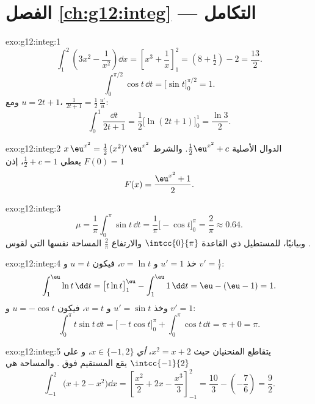 \section*{الفصل \ref{ch:g12:integ} --- التكامل}

\begin{solution}{exo:g12:integ:1}
\[
\int_1^2 \left(3x^2 - \frac{1}{x^2}\right)\dd x
= \left[x^3 + \frac1x\right]_1^2 = \left(8 + \tfrac12\right) - 2 = \frac{13}{2}.
\]
\[
\int_0^{\pi/2} \cos t\,\dd t = \bigl[\sin t\bigr]_0^{\pi/2} = 1 .
\]
ومع $u = 2t+1$، $\frac{1}{2t+1} = \frac12\,\frac{u'}{u}$:
\[
\int_0^1 \frac{\dd t}{2t+1} = \frac12\bigl[\ln(2t+1)\bigr]_0^1
= \frac{\ln 3}{2}.
\]
\end{solution}

\begin{solution}{exo:g12:integ:2}
 $x\,\eu^{x^2} = \frac12\,(x^2)'\,\eu^{x^2}$ الدوال الأصلية
$\frac12\eu^{x^2} + c$. والشرط $F(0) = 1$ يعطي $\frac12 + c = 1$،
إذن
\[
F(x) = \frac{\eu^{x^2} + 1}{2}.
\]
\end{solution}

\begin{solution}{exo:g12:integ:3}
\[
\mu = \frac{1}{\pi}\int_0^\pi \sin t\,\dd t
= \frac{1}{\pi}\bigl[-\cos t\bigr]_0^\pi = \frac{2}{\pi} \approx 0.64 .
\]
وبيانيًا، للمستطيل ذي القاعدة $\intcc{0}{\pi}$ والارتفاع
$\frac{2}{\pi}$ المساحة نفسها التي لقوس  .
\end{solution}

\begin{solution}{exo:g12:integ:4}
خذ $u' = 1$ و $v = \ln t$، فيكون $u = t$ و $v' = \frac1t$:
\[
\int_1^{\eu} \ln t\,\dd t = \bigl[t\ln t\bigr]_1^{\eu} - \int_1^{\eu} 1\,\dd t
= \eu - (\eu - 1) = 1 .
\]
وخذ $u' = \sin t$ و $v = t$، فيكون $u = -\cos t$ و $v' = 1$:
\[
\int_0^\pi t\sin t\,\dd t = \bigl[-t\cos t\bigr]_0^\pi + \int_0^\pi \cos t\,\dd t
= \pi + 0 = \pi .
\]
\end{solution}

\begin{solution}{exo:g12:integ:5}
يتقاطع المنحنيان حيث $x^2 = x + 2$، \emph{أي} $x \in \{-1, 2\}$، و
على $\intcc{-1}{2}$ يقع المستقيم فوق . والمساحة هي
\[
\int_{-1}^{2} \bigl(x + 2 - x^2\bigr)\dd x
= \left[\frac{x^2}{2} + 2x - \frac{x^3}{3}\right]_{-1}^{2}
= \frac{10}{3} - \left(-\frac{7}{6}\right) = \frac{9}{2}.
\]
\end{solution}

